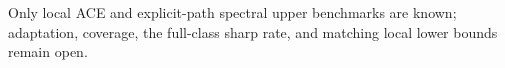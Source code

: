 Only local ACE and explicit-path spectral upper benchmarks are known; adaptation, coverage, the full-class sharp rate, and matching local lower bounds remain open.